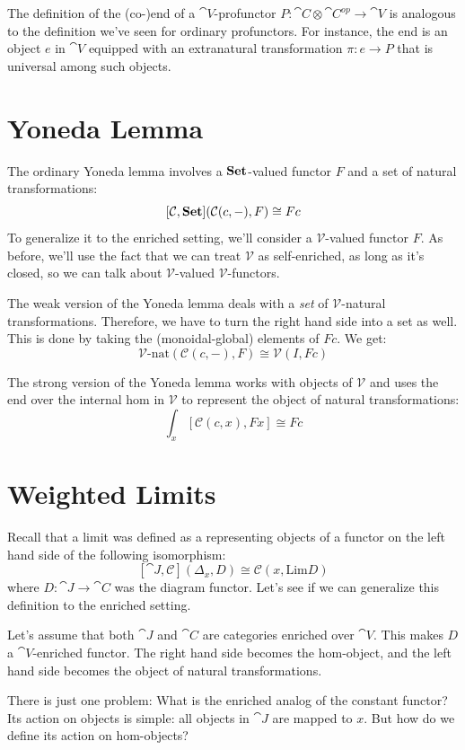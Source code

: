 \documentclass[DaoFP]{subfiles}
\begin{document}
The definition of the (co-)end of a $\cat V$-profunctor $P \colon \cat C \otimes \cat C^{op} \to \cat V$ is analogous to the definition we've seen for ordinary profunctors. For instance, the end is an object $e$ in $\cat V$ equipped with an extranatural transformation $\pi \colon e \to P$ that is universal among such objects. 

\section{Yoneda Lemma}

The ordinary Yoneda lemma involves a $\mathbf{Set}$-valued functor $F$ and a set of natural transformations:
\[ [\mathcal C, \mathbf{Set}]( \mathcal C(c, -), F) \cong F c \]
To generalize it to the enriched setting, we'll consider a $\mathcal V$-valued functor $F$. As before, we'll use the fact that we can treat $\mathcal V$ as self-enriched, as long as it's closed, so we can talk about $\mathcal V$-valued $\mathcal V$-functors. 

The weak version of the Yoneda lemma deals with a \emph{set} of $\mathcal V$-natural transformations. Therefore, we have to turn the right hand side into a set as well. This is done by taking the (monoidal-global) elements of $F c$. We get:
\[ \mathcal V\text{-nat} ( \mathcal C(c, -), F) \cong \mathcal V(I, F c) \]

The strong version of the Yoneda lemma works with objects of $\mathcal V$ and uses the end over the internal hom in $\mathcal V$ to represent the object of natural transformations:
\[ \int_x [\mathcal C( c, x), F x] \cong F c \]

\section{Weighted Limits}

Recall that a limit was defined as a representing objects of a functor on the left hand side of the following isomorphism:
\[ [\cat J, \mathcal{C}](\Delta_x, D)  \cong \mathcal{C}(x, \text{Lim}D) \]
where $D \colon \cat J \to \cat C$ was the diagram functor. Let's see if we can generalize this definition to the enriched setting.

Let's assume that both $\cat J$ and $\cat C$ are categories enriched over $\cat V$. This makes $D$ a $\cat V$-enriched functor. The right hand side becomes the hom-object, and the left hand side becomes the object of natural transformations. 

There is just one problem: What is the enriched analog of the constant functor? Its action on objects is simple: all objects in $\cat J$ are mapped to $x$. But how do we define its action on hom-objects? 
\end{document}
